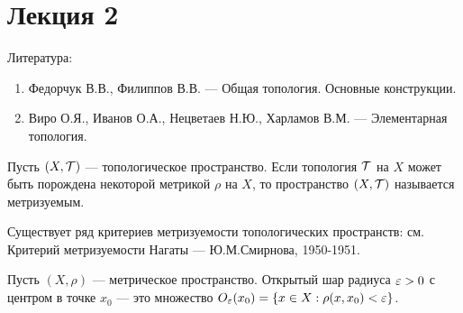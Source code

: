 \section{Лекция 2}

Литература:
\begin{enumerate}
    \item Федорчук В.В., Филиппов В.В. --- Общая топология. Основные конструкции.
    \item Виро О.Я., Иванов О.А., Нецветаев Н.Ю., Харламов В.М. --- Элементарная топология.
\end{enumerate}

\begin{definition}
    Пусть $(X, \mathcal{T})$ --- топологическое пространство. Если топология $\mathcal{T}$ на $X$ может быть порождена некоторой метрикой $\rho$ на $X$, то пространство $(X, \mathcal{T})$ называется метризуемым.
\end{definition}

\begin{nota_bene}
    Существует ряд критериев метризуемости топологических пространств: см. Критерий метризуемости Нагаты --- Ю.М.Смирнова, 1950-1951.
\end{nota_bene}

\begin{definition}
    Пусть $(X, \rho)$ --- метрическое пространство. Открытый шар радиуса $\varepsilon > 0$ с центром в точке $x_0$ --- это множество $O_{\varepsilon}(x_0) = \left\{x \in X : \rho(x, x_0) < \varepsilon\right\}$.
\end{definition}

